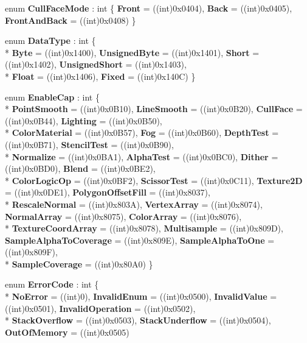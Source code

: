 \begin{DoxyCompactItemize}
enum {\bfseries Cull\-Face\-Mode} \-: int \{ {\bfseries Front} = ((int)0x0404), 
{\bfseries Back} = ((int)0x0405), 
{\bfseries Front\-And\-Back} = ((int)0x0408)
 \}
\item 
enum {\bfseries Data\-Type} \-: int \{ \\*
{\bfseries Byte} = ((int)0x1400), 
{\bfseries Unsigned\-Byte} = ((int)0x1401), 
{\bfseries Short} = ((int)0x1402), 
{\bfseries Unsigned\-Short} = ((int)0x1403), 
\\*
{\bfseries Float} = ((int)0x1406), 
{\bfseries Fixed} = ((int)0x140\-C)
 \}
\item 
enum {\bfseries Enable\-Cap} \-: int \{ \\*
{\bfseries Point\-Smooth} = ((int)0x0\-B10), 
{\bfseries Line\-Smooth} = ((int)0x0\-B20), 
{\bfseries Cull\-Face} = ((int)0x0\-B44), 
{\bfseries Lighting} = ((int)0x0\-B50), 
\\*
{\bfseries Color\-Material} = ((int)0x0\-B57), 
{\bfseries Fog} = ((int)0x0\-B60), 
{\bfseries Depth\-Test} = ((int)0x0\-B71), 
{\bfseries Stencil\-Test} = ((int)0x0\-B90), 
\\*
{\bfseries Normalize} = ((int)0x0\-B\-A1), 
{\bfseries Alpha\-Test} = ((int)0x0\-B\-C0), 
{\bfseries Dither} = ((int)0x0\-B\-D0), 
{\bfseries Blend} = ((int)0x0\-B\-E2), 
\\*
{\bfseries Color\-Logic\-Op} = ((int)0x0\-B\-F2), 
{\bfseries Scissor\-Test} = ((int)0x0\-C11), 
{\bfseries Texture2\-D} = ((int)0x0\-D\-E1), 
{\bfseries Polygon\-Offset\-Fill} = ((int)0x8037), 
\\*
{\bfseries Rescale\-Normal} = ((int)0x803\-A), 
{\bfseries Vertex\-Array} = ((int)0x8074), 
{\bfseries Normal\-Array} = ((int)0x8075), 
{\bfseries Color\-Array} = ((int)0x8076), 
\\*
{\bfseries Texture\-Coord\-Array} = ((int)0x8078), 
{\bfseries Multisample} = ((int)0x809\-D), 
{\bfseries Sample\-Alpha\-To\-Coverage} = ((int)0x809\-E), 
{\bfseries Sample\-Alpha\-To\-One} = ((int)0x809\-F), 
\\*
{\bfseries Sample\-Coverage} = ((int)0x80\-A0)
 \}
\item 
enum {\bfseries Error\-Code} \-: int \{ \\*
{\bfseries No\-Error} = ((int)0), 
{\bfseries Invalid\-Enum} = ((int)0x0500), 
{\bfseries Invalid\-Value} = ((int)0x0501), 
{\bfseries Invalid\-Operation} = ((int)0x0502), 
\\*
{\bfseries Stack\-Overflow} = ((int)0x0503), 
{\bfseries Stack\-Underflow} = ((int)0x0504), 
{\bfseries Out\-Of\-Memory} = ((int)0x0505)

\end{DoxyCompactItemize}
